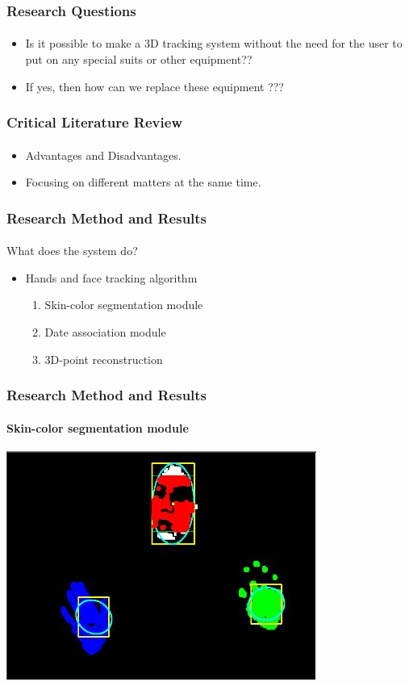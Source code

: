 \documentclass{beamer}
\begin{document}
\begin{frame}
\frametitle{Research Questions}
\framesubtitle{}
\begin{itemize}
\item Is it possible to make a 3D tracking system without the need for the user to put on any special suits or other equipment?? 
\item If yes, then how can we replace these equipment ???  
\end{itemize}
	
\end{frame}

\begin{frame}
\frametitle{Critical Literature Review}
\framesubtitle{}
\begin{itemize}
\item Advantages and Disadvantages.
\item Focusing on different matters at the same time. 
\end{itemize}

\end{frame}

\begin{frame}
\frametitle{Research Method and Results}
\framesubtitle{}
{\huge  What does the system do?} \\
\begin{itemize}
\item  Hands and face tracking algorithm \\
	\begin{enumerate}
	\item Skin-color segmentation module
	\item Date association module
	\item 3D-point reconstruction
	\end{enumerate}

\end{itemize}

\end{frame}


\begin{frame}
\frametitle{Research Method and Results }
\framesubtitle{Skin-color segmentation module}
\includegraphics[scale=0.8]{track.jpg}

\end{frame}
\end{document}
